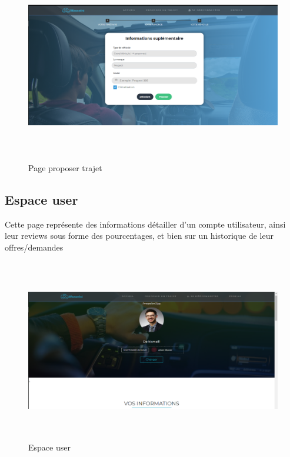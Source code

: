 \documentclass[a4paper]{report}
\begin{document}
\begin{spacing}{2}
\begin{figure}[!ht]
\begin{center}
\includegraphics[height=8.5cm]{propo3.png}
\end{center}
\caption[Page proposer trajet]{Page proposer trajet}
\end{figure}

\subsection{Espace user}
Cette page représente des informations détailler d'un compte utilisateur, ainsi leur reviews sous forme des pourcentages, et bien sur un historique de leur offres/demandes\\ 
\begin{figure}[!ht]
\begin{center}
\includegraphics[height=8cm]{user1.png}
\end{center}
\caption[Espace user]{Espace user}
\end{figure}


\end{spacing}
\end{document}
